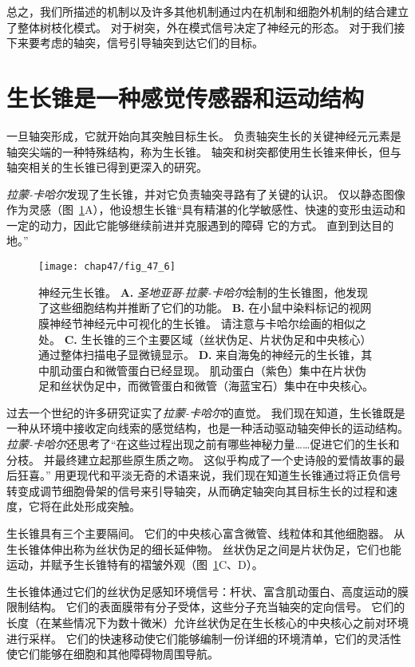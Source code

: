 总之，我们所描述的机制以及许多其他机制通过内在机制和细胞外机制的结合建立了整体树枝化模式。
对于树突，外在模式信号决定了神经元的形态。
对于我们接下来要考虑的轴突，信号引导轴突到达它们的目标。



\section{生长锥是一种感觉传感器和运动结构}

一旦轴突形成，它就开始向其突触目标生长。
负责轴突生长的关键神经元元素是轴突尖端的一种特殊结构，称为生长锥。
轴突和树突都使用生长锥来伸长，但与轴突相关的生长锥已得到更深入的研究。


\textit{拉蒙-卡哈尔}发现了生长锥，并对它负责轴突寻路有了关键的认识。
仅以静态图像作为灵感（图~\ref{fig:47_6}A），他设想生长锥“具有精湛的化学敏感性、快速的变形虫运动和一定的动力，因此它能够继续前进并克服遇到的障碍 它的方式。 
直到到达目的地。”


\begin{figure}[htbp]
	\centering
	\texttt{[image: chap47/fig\_47\_6]}
	\caption{神经元生长锥。
		\textbf{A.} \textit{圣地亚哥$\cdot$拉蒙-卡哈尔}绘制的生长锥图，他发现了这些细胞结构并推断了它们的功能。
		\textbf{B.} 在小鼠中染料标记的视网膜神经节神经元中可视化的生长锥。
		请注意与卡哈尔绘画的相似之处。
		\textbf{C.} 生长锥的三个主要区域（丝状伪足、片状伪足和中央核心）通过整体扫描电子显微镜显示。
		\textbf{D.} 来自海兔的神经元的生长锥，其中肌动蛋白和微管蛋白已经显现。
		肌动蛋白（紫色）集中在片状伪足和丝状伪足中，而微管蛋白和微管（海蓝宝石）集中在中央核心。}
	\label{fig:47_6}
\end{figure}


过去一个世纪的许多研究证实了\textit{拉蒙-卡哈尔}的直觉。
我们现在知道，生长锥既是一种从环境中接收定向线索的感觉结构，也是一种活动驱动轴突伸长的运动结构。
\textit{拉蒙-卡哈尔}还思考了“在这些过程出现之前有哪些神秘力量……促进它们的生长和分枝。
并最终建立起那些原生质之吻。
这似乎构成了一个史诗般的爱情故事的最后狂喜。” 
用更现代和平淡无奇的术语来说，我们现在知道生长锥通过将正负信号转变成调节细胞骨架的信号来引导轴突，从而确定轴突向其目标生长的过程和速度，它将在此处形成突触。


生长锥具有三个主要隔间。
它们的中央核心富含微管、线粒体和其他细胞器。
从生长锥体伸出称为丝状伪足的细长延伸物。
丝状伪足之间是片状伪足，它们也能运动，并赋予生长锥特有的褶皱外观（图~\ref{fig:47_6}C、D）。


生长锥体通过它们的丝状伪足感知环境信号：杆状、富含肌动蛋白、高度运动的膜限制结构。
它们的表面膜带有分子受体，这些分子充当轴突的定向信号。
它们的长度（在某些情况下为数十微米）允许丝状伪足在生长核心的中央核心之前对环境进行采样。
它们的快速移动使它们能够编制一份详细的环境清单，它们的灵活性使它们能够在细胞和其他障碍物周围导航。


